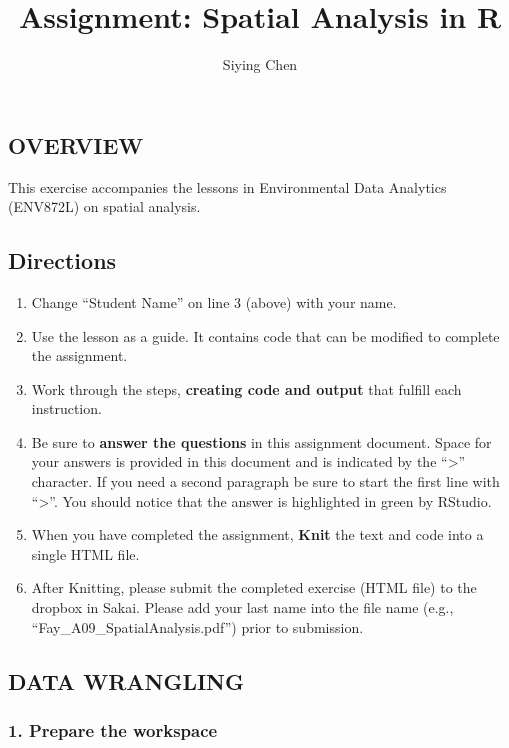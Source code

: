 \documentclass[]{article}
\title{Assignment: Spatial Analysis in R}
\author{Siying Chen}
\date{}
\providecommand{\tightlist}{%
  \setlength{\itemsep}{0pt}\setlength{\parskip}{0pt}}
\begin{document}
\maketitle

{
\setcounter{tocdepth}{2}
\tableofcontents
}
\subsection{OVERVIEW}\label{overview}

This exercise accompanies the lessons in Environmental Data Analytics
(ENV872L) on spatial analysis.

\subsection{Directions}\label{directions}

\begin{enumerate}
\def\labelenumi{\arabic{enumi}.}
\tightlist
\item
  Change ``Student Name'' on line 3 (above) with your name.
\item
  Use the lesson as a guide. It contains code that can be modified to
  complete the assignment.
\item
  Work through the steps, \textbf{creating code and output} that fulfill
  each instruction.
\item
  Be sure to \textbf{answer the questions} in this assignment document.
  Space for your answers is provided in this document and is indicated
  by the ``\textgreater{}'' character. If you need a second paragraph be
  sure to start the first line with ``\textgreater{}''. You should
  notice that the answer is highlighted in green by RStudio.
\item
  When you have completed the assignment, \textbf{Knit} the text and
  code into a single HTML file.
\item
  After Knitting, please submit the completed exercise (HTML file) to
  the dropbox in Sakai. Please add your last name into the file name
  (e.g., ``Fay\_A09\_SpatialAnalysis.pdf'') prior to submission.
\end{enumerate}

\subsection{DATA WRANGLING}\label{data-wrangling}

\subsubsection{1. Prepare the workspace}\label{prepare-the-workspace}
\end{document}
